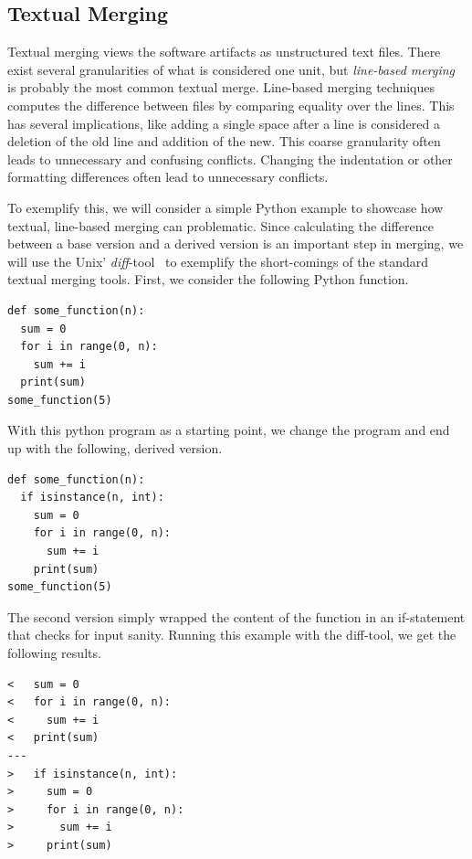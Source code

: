 \documentclass[a4paper,english]{ifimaster}
\begin{document}
\subsection{Textual Merging}%
\label{sub:textual_merging}

Textual merging views the software artifacts as unstructured text files. There exist several granularities of what is considered one unit, but \textit{line-based merging} is probably the most common textual merge. Line-based merging techniques computes the difference between files by comparing equality over the lines. This has several implications, like adding a single space after a line is considered a deletion of the old line and addition of the new. This coarse granularity often leads to unnecessary and confusing conflicts. Changing the indentation or other formatting differences often lead to unnecessary conflicts.

To exemplify this, we will consider a simple Python example to showcase how textual, line-based merging can problematic. Since calculating the difference between a base version and a derived version is an important step in merging, we will use the Unix' \textit{diff}-tool~\cite{cite:fast_algo_for_lcs} to exemplify the short-comings of the standard textual merging tools. First, we consider the following Python function.

\begin{verbatim}
def some_function(n):
  sum = 0
  for i in range(0, n):
    sum += i
  print(sum)
some_function(5)
\end{verbatim}

With this python program as a starting point, we change the program and end up with the following, derived version.

\begin{verbatim}
def some_function(n):
  if isinstance(n, int):
    sum = 0
    for i in range(0, n):
      sum += i
    print(sum)
some_function(5)
\end{verbatim}

The second version simply wrapped the content of the function in an if-statement that checks for input sanity. Running this example with the diff-tool, we get the following results.

\begin{verbatim}
<   sum = 0
<   for i in range(0, n):
<     sum += i
<   print(sum)
---
>   if isinstance(n, int):
>     sum = 0
>     for i in range(0, n):
>       sum += i
>     print(sum)
\end{verbatim}
\end{document}
